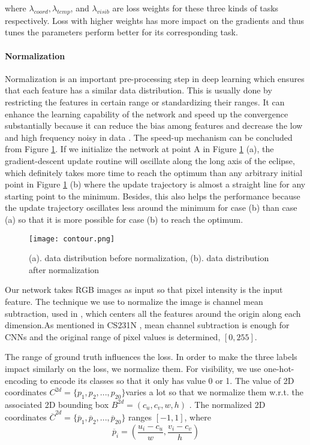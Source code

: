 where $\lambda_{coord}, \lambda_{temp}$, and $\lambda_{visib}$ are loss weights for these three kinds of tasks respectively. Loss with higher weights has more impact on the gradients and thus tunes the parameters perform better for its corresponding task.

\paragraph{Normalization}
\label{normalization}
Normalization is an important pre-processing step in deep learning which ensures that each feature has a similar data distribution. This is usually done by restricting the features in certain range or standardizing their ranges. It can enhance the learning capability of the network and speed up the convergence substantially  because it can reduce the bias among features and decrease the low and high frequency noisy in data \cite{Jayalakshmi2011}. The speed-up mechanism can be concluded from Figure \ref{figure:contour}. If we initialize the network at point A in Figure \ref{figure:contour} (a), the gradient-descent update routine will oscillate along the long axis of the eclipse, which definitely takes more time to reach the optimum than any arbitrary initial point in Figure \ref{figure:contour} (b) where the update trajectory is almost a straight line for any starting point  to the minimum. Besides, this also helps the performance because the update trajectory oscillates less around the minimum for case (b) than case (a) so that it is more possible for case (b) to reach the optimum.

\begin{figure}[h]		
	\texttt{[image: contour.png]}
	\caption{(a). data distribution before normalization, (b). data distribution after normalization}
	\centering
	\label{figure:contour}
\end{figure}

Our network takes RGB images as input so that pixel intensity is the input feature. The technique we use to normalize the image is channel mean subtraction, used in \cite{DBLP:journals/corr/SimonyanZ14a, DBLP:journals/corr/GirshickDDM13}, which centers all the features around the origin along each dimension.As mentioned in CS231N \cite{CS231N}, mean channel subtraction is enough for CNNs and the original range of pixel values is determined, \ie $[0, 255]$.

The range of ground truth influences the loss. In order to make the three labels impact similarly on the loss, we normalize them. For visibility, we use one-hot-encoding \cite{One-hot} to encode its classes so that it only has value 0 or 1. The value of 2D coordinates $C^{2d}  = \{p_1, p_2, ...,p_{20}\}$varies a lot so that we normalize them w.r.t. the associated 2D bounding box $B^{2d} = (c_u, c_v, w, h)$ \cite{DBLP:journals/corr/ChabotCRTC17}. The normalized 2D coordinates $\overline{C}^{2d}  = \{\overline{p}_1, \overline{p}_2, ...,\overline{p}_{20}\}$ ranges $[-1, 1]$, where
\begin{equation}
\overline{p}_i  = (\frac{u_i - c_u}{w}, \frac{v_i - c_v}{h})
\end{equation}

